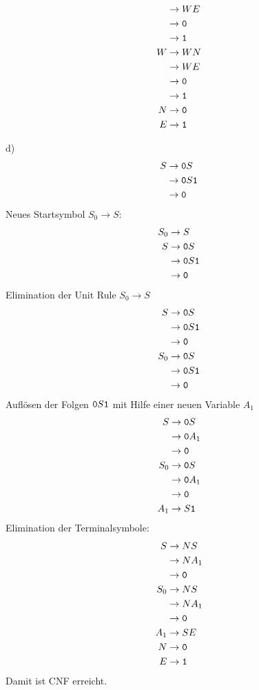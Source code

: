 \begin{loesung}
\begin{teilaufgaben}
\begin{align*}
 &\rightarrow WE\\
 &\rightarrow {\tt 0}\\
 &\rightarrow {\tt 1}\\
W&\rightarrow WN\\
 &\rightarrow WE\\
 &\rightarrow {\tt 0}\\
 &\rightarrow {\tt 1}\\
N&\rightarrow {\tt 0}\\
E&\rightarrow {\tt 1}\\
\end{align*}
\item[d)]
\begin{align*}
S&\rightarrow {\tt 0}S\\
 &\rightarrow {\tt 0}S{\tt 1}\\
 &\rightarrow {\tt 0}
\end{align*}
Neues Startsymbol $S_0\to S$:
\begin{align*}
S_0&\rightarrow S\\
S&\rightarrow {\tt 0}S\\
 &\rightarrow {\tt 0}S{\tt 1}\\
 &\rightarrow {\tt 0}
\end{align*}
Elimination der Unit Rule $S_0\to S$
\begin{align*}
S&\rightarrow {\tt 0}S\\
 &\rightarrow {\tt 0}S{\tt 1}\\
 &\rightarrow {\tt 0}\\
S_0&\rightarrow {\tt 0}S\\
 &\rightarrow {\tt 0}S{\tt 1}\\
 &\rightarrow {\tt 0}
\end{align*}
Auflösen der Folgen ${\tt 0}S{\tt 1}$ mit Hilfe einer neuen Variable
$A_1$
\begin{align*}
S&\rightarrow {\tt 0}S\\
 &\rightarrow {\tt 0}A_1\\
 &\rightarrow {\tt 0}\\
S_0&\rightarrow {\tt 0}S\\
 &\rightarrow {\tt 0}A_1\\
 &\rightarrow {\tt 0}\\
A_1&\rightarrow S{\tt 1}
\end{align*}
Elimination der Terminalsymbole:
\begin{align*}
S&\rightarrow NS\\
 &\rightarrow NA_1\\
 &\rightarrow {\tt 0}\\
S_0&\rightarrow NS\\
 &\rightarrow NA_1\\
 &\rightarrow {\tt 0}\\
A_1&\rightarrow SE\\
N&\rightarrow {\tt 0}\\
E&\rightarrow {\tt 1}\\
\end{align*}
Damit ist CNF erreicht.
\qedhere
\end{teilaufgaben}
\end{loesung}
